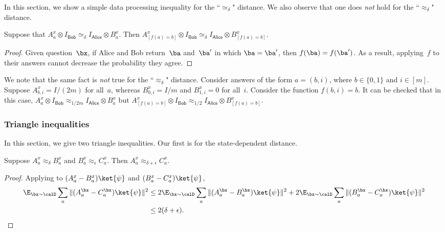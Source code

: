 \documentclass[11pt]{article}
\newcommand{\consistency}{\simeq}
\newcommand{\reg}[1]{{\mathsf{#1}}}
\begin{document}
In this section, we show a simple data processing inequality for the ``$\consistency_\delta$" distance.
We also observe that one does \emph{not} hold for the ``$\approx_\delta$" distance.

\begin{fact}\label{fact:specialize-the-simeq}
Suppose that $A^x_a \otimes I_{\reg{Bob}} \consistency_\delta I_{\reg{Alice}} \otimes B^x_a$.
Then $A^x_{[f(a) = b]} \otimes I_{\reg{Bob}} \consistency_\delta I_{\reg{Alice}} \otimes B^x_{[f(a) = b]}$.
\end{fact}
\begin{proof}
Given question~$\bx$, if Alice and Bob return~$\ba$ and~$\ba'$ in which $\ba = \ba'$, then $f(\ba) = f(\ba')$.
As a result, applying~$f$ to their answers cannot decrease the probability they agree.
\end{proof}

\begin{remark}
We note that the same fact is \emph{not} true for the ``$\approx_\delta$" distance.
Consider answers of the form $a = (b, i)$, where $b \in \{0, 1\}$ and $i \in [m]$.
Suppose $A^x_{b, i} = I/(2m)$ for all~$a$, whereas $B^x_{0, i} = I/m$ and $B^x_{1, i} = 0$ for all~$i$.
Consider the function $f(b, i) = b$.
It can be checked that in this case, $A^x_a \otimes I_{\reg{Bob}} \approx_{1/2m} I_{\reg{Alice}} \otimes B^x_a$
but $A^x_{[f(a) = b]} \otimes I_{\reg{Bob}} \approx_{1/2} I_{\reg{Alice}} \otimes B^x_{[f(a) = b]}$.
\end{remark}

\subsubsection{Triangle inequalities}

In this section, we give two triangle inequalities. Our first is for the state-dependent distance.

\begin{fact}\label{fact:triangle}
Suppose $A_a^x \approx_\delta B_a^x$ and $B_a^x \approx_\epsilon C_a^x$. Then $A_a^x \approx_{\delta + \epsilon} C_a^x$.
\end{fact}
\begin{proof}
Applying  to $(A_{a}^{x} - B_{a}^{x} ) \ket{\psi}$ and $(B_{a}^{x} - C_{a}^{x} ) \ket{\psi}$,
\begin{align*}
\E_{\bx \sim \calD} \sum_a \Vert (A_{a}^{\bx} - C_{a}^{\bx} ) \ket{\psi}\Vert^2
&\leq 2 \E_{\bx \sim \calD} \sum_a \Vert (A_{a}^{\bx} - B_{a}^{\bx} ) \ket{\psi}\Vert^2 + 2 \E_{\bx \sim \calD} \sum_a \Vert (B_{a}^{\bx} - C_{a}^{\bx} ) \ket{\psi}\Vert^2\\
&\leq 2 (\delta + \epsilon).\qedhere
\end{align*}
\end{proof}
\end{document}
